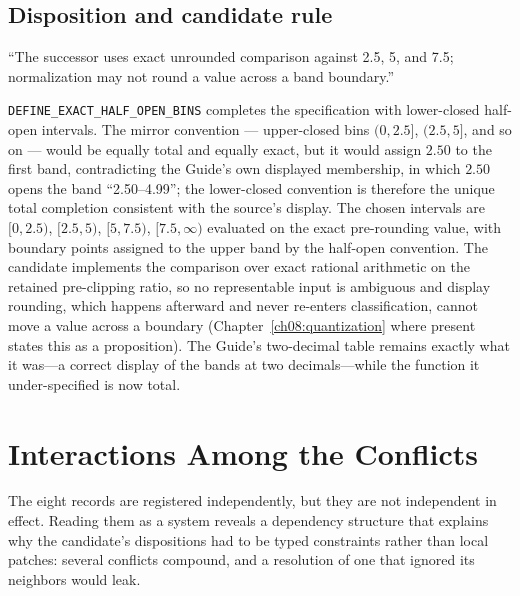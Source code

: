 \subsection{Disposition and candidate rule}

\begin{ruleenv}\label{ch04:rule:q4}
``The successor uses exact unrounded comparison against 2.5, 5, and 7.5;
normalization may not round a value across a band boundary.''
\end{ruleenv}

\texttt{DEFINE\_EXACT\_HALF\_OPEN\_BINS} completes the specification with
lower-closed half-open intervals. The mirror convention --- upper-closed
bins $(0,2.5]$, $(2.5,5]$, and so on --- would be equally total and equally
exact, but it would assign $2.50$ to the first band, contradicting the
Guide's own displayed membership, in which $2.50$ opens the band
``2.50--4.99''; the lower-closed convention is therefore the unique total
completion consistent with the source's display. The chosen intervals are
$[0,2.5)$, $[2.5,5)$,
$[5,7.5)$, $[7.5,\infty)$ evaluated on the exact pre-rounding value, with
boundary points assigned to the upper band by the half-open convention. The
candidate implements the comparison over exact rational arithmetic on the
retained pre-clipping ratio, so no representable input is ambiguous and
display rounding, which happens afterward and never re-enters
classification, cannot move a value across a boundary
(Chapter~\ref{ch08:quantization} where present states this as a
proposition). The Guide's two-decimal table remains exactly what it was---a
correct display of the bands at two decimals---while the function it
under-specified is now total.

\section{Interactions Among the Conflicts}\label{ch04:interactions}

The eight records are registered independently, but they are not independent
in effect. Reading them as a system reveals a dependency structure that
explains why the candidate's dispositions had to be typed constraints rather
than local patches: several conflicts compound, and a resolution of one that
ignored its neighbors would leak.

